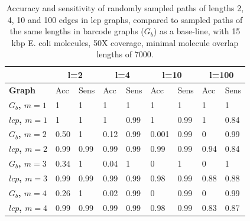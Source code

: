 \documentclass[a4paper,UKenglish,cleveref, autoref, thm-restate,authorcolumns]{lipics-v2019}
\begin{document}
\begin{table}
\begin{tabular}{ |p{2.3cm}||p{1cm}|p{1cm}|p{1cm}|p{1cm}|p{1cm}|p{1cm}|p{1cm}|p{1cm}|  }
 \hline
   & \multicolumn{2}{c|}{\textbf{l=2}}
   & \multicolumn{2}{c|}{\textbf{l=4}} 
   & \multicolumn{2}{c|}{\textbf{l=10}}
   & \multicolumn{2}{c|}{\textbf{l=100}} 
   \\
 \hline
\textbf{Graph}  & Acc & Sens & Acc & Sens & Acc & Sens & Acc & Sens \\
\hline
\hline
\textbf{$G_b$, $m=1$} &
 1 & 1 & %
 1 & 1 & %
 1 & 1 &  %
 1 & 1 %
 \\
 \textbf{$lcp$, $m=1$} &
 1 & 1 &  %
 1 & 0.99 & %
 1 & 0.99 &  %
 1 & 0.84  %
 \\
 \hline
 \textbf{$G_b$, $m=2$} & 
 0.50 & 1 &  %
 0.12 & 0.99 & %
 0.001 & 0.99 &  %
 0 & 0.99     %
 \\
 \textbf{$lcp$, $m=2$} &
 0.99 & 0.99 &  %
 0.99 & 0.99 & %
 0.99 & 0.99 &  %
 0.94 & 0.84   %
 \\
 \hline
 \textbf{$G_b$, $m=3$} & 
 0.34 & 1 &  %
 0.04 & 1 & %
 0 &  1   &  %
 0 &  1      %
 \\
 \textbf{$lcp$, $m=3$} &
 0.99 & 0.99 &   %
 0.99 & 0.99 & %
 0.98 & 0.99 &  %
 0.88 & 0.88 %
 \\
 \hline
 \textbf{$G_b$, $m=4$} & 
 0.26 & 1 &  %
 0.02 & 0.99 & %
 0 & 0.99 & %
 0 &  0.99  %
 \\
 \textbf{$lcp$, $m=4$} &
 0.99 & 0.99  &  %
 0.99 & 0.99 & %
 0.98 & 0.99 &  %
 0.83  & 0.87  %
 \\
 \hline
\end{tabular}
\caption{Accuracy and sensitivity of randomly sampled paths of lengths 2, 4, 10 and 100 edges in lcp graphs, compared to sampled paths of the same lengths in barcode graphs ($G_b$) as a base-line, with 15 kbp E. coli molecules, 50X coverage, minimal molecule overlap lengths of 7000. \label{tab:d2-local-quality}}
\end{table}
\end{document}
